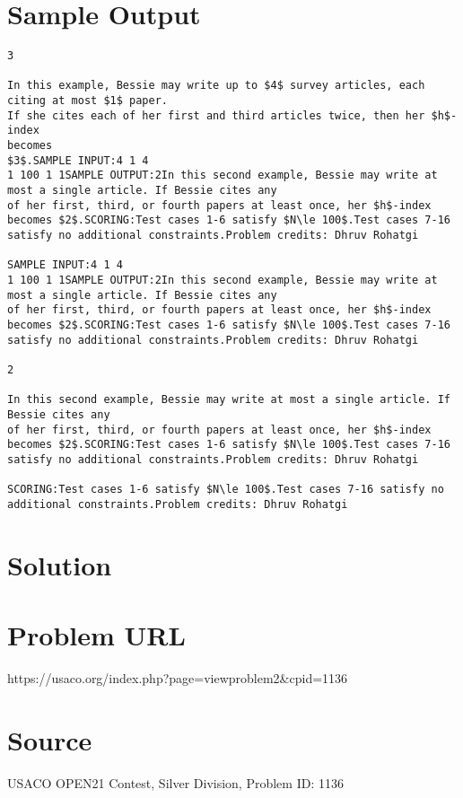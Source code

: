 \documentclass[12pt]{article}
\begin{document}
\section*{Sample Output}
\begin{verbatim}
3

In this example, Bessie may write up to $4$ survey articles, each citing at most $1$ paper.
If she cites each of her first and third articles twice, then her $h$-index
becomes
$3$.SAMPLE INPUT:4 1 4
1 100 1 1SAMPLE OUTPUT:2In this second example, Bessie may write at most a single article. If Bessie cites any
of her first, third, or fourth papers at least once, her $h$-index becomes $2$.SCORING:Test cases 1-6 satisfy $N\le 100$.Test cases 7-16 satisfy no additional constraints.Problem credits: Dhruv Rohatgi

SAMPLE INPUT:4 1 4
1 100 1 1SAMPLE OUTPUT:2In this second example, Bessie may write at most a single article. If Bessie cites any
of her first, third, or fourth papers at least once, her $h$-index becomes $2$.SCORING:Test cases 1-6 satisfy $N\le 100$.Test cases 7-16 satisfy no additional constraints.Problem credits: Dhruv Rohatgi

2

In this second example, Bessie may write at most a single article. If Bessie cites any
of her first, third, or fourth papers at least once, her $h$-index becomes $2$.SCORING:Test cases 1-6 satisfy $N\le 100$.Test cases 7-16 satisfy no additional constraints.Problem credits: Dhruv Rohatgi

SCORING:Test cases 1-6 satisfy $N\le 100$.Test cases 7-16 satisfy no additional constraints.Problem credits: Dhruv Rohatgi
\end{verbatim}

\section*{Solution}


\section*{Problem URL}
https://usaco.org/index.php?page=viewproblem2&cpid=1136

\section*{Source}
USACO OPEN21 Contest, Silver Division, Problem ID: 1136
\end{document}
